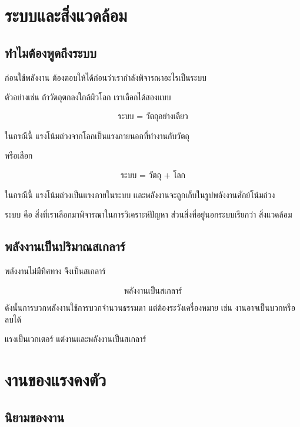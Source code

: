 \newpage{}

\section{ระบบและสิ่งแวดล้อม}

\subsection{ทำไมต้องพูดถึงระบบ}

ก่อนใช้พลังงาน ต้องตอบให้ได้ก่อนว่าเรากำลังพิจารณาอะไรเป็นระบบ

ตัวอย่างเช่น ถ้าวัตถุตกลงใกล้ผิวโลก เราเลือกได้สองแบบ

\[
\text{ระบบ = วัตถุอย่างเดียว}
\]

ในกรณีนี้ แรงโน้มถ่วงจากโลกเป็นแรงภายนอกที่ทำงานกับวัตถุ

หรือเลือก

\[
\text{ระบบ = วัตถุ + โลก}
\]

ในกรณีนี้ แรงโน้มถ่วงเป็นแรงภายในระบบ และพลังงานจะถูกเก็บในรูปพลังงานศักย์โน้มถ่วง

\begin{tcolorbox}[title=นิยาม]
ระบบ คือ สิ่งที่เราเลือกมาพิจารณาในการวิเคราะห์ปัญหา ส่วนสิ่งที่อยู่นอกระบบเรียกว่า สิ่งแวดล้อม
\end{tcolorbox}

\subsection{พลังงานเป็นปริมาณสเกลาร์}

พลังงานไม่มีทิศทาง จึงเป็นสเกลาร์

\[
\text{พลังงานเป็นสเกลาร์}
\]

ดังนั้นการบวกพลังงานใช้การบวกจำนวนธรรมดา แต่ต้องระวังเครื่องหมาย เช่น งานอาจเป็นบวกหรือลบได้

\begin{tcolorbox}[title=ข้อควรจำ]
แรงเป็นเวกเตอร์ แต่งานและพลังงานเป็นสเกลาร์
\end{tcolorbox}

\section{งานของแรงคงตัว}

\subsection{นิยามของงาน}

